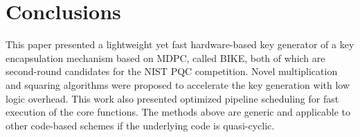 \documentclass[preprint]{iacrtrans}
\begin{document}
\section{Conclusions}
This paper presented a lightweight yet fast hardware-based key generator of a key encapsulation mechanism based on MDPC, called BIKE, both of which are second-round candidates for the NIST PQC competition. Novel multiplication and squaring algorithms were proposed to accelerate the key generation with low logic overhead. This work also presented optimized pipeline scheduling for fast execution of the core functions. The methods above are generic and applicable to other code-based schemes if the underlying code is quasi-cyclic.





\end{document}
